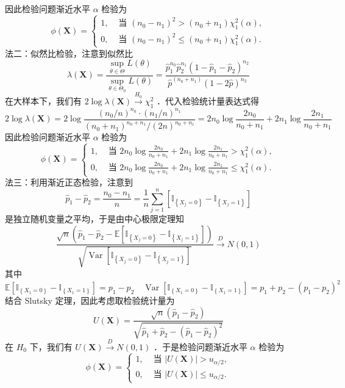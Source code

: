 \documentclass[UTF8]{ctexart}
\begin{document}
因此检验问题渐近水平 $\alpha$ 检验为
$$
\phi(\boldsymbol{X})= \begin{cases}1, & \text { 当 }\left(n_0-n_1\right)^2>\left(n_0+n_1\right) \chi_1^2(\alpha), \\ 0, & \text { 当 }\left(n_0-n_1\right)^2 \leq\left(n_0+n_1\right) \chi_1^2(\alpha) .\end{cases}
$$
法二：似然比检验，注意到似然比
$$
\lambda(\boldsymbol{X})=\frac{\sup _{\theta \in \Theta} L(\theta)}{\sup _{\theta \in \Theta_0} L(\theta)}=\frac{\hat{p}_1^{n_0} \hat{p}_2^{n_1}\left(1-\hat{p}_1-\hat{p}_2\right)^{n_2}}{\hat{p}^{\left(n_0+n_1\right)}(1-2 \hat{p})^{n_2}}
$$
在大样本下，我们有 $2 \log \lambda(\boldsymbol{X}) \xrightarrow{H_0} \chi_1^2$ ．代入检验统计量表达式得
$$
2 \log \lambda(\boldsymbol{X})=2 \log \frac{\left(n_0 / n\right)^{n_0} \cdot\left(n_1 / n\right)^{n_1}}{\left(n_0+n_1\right)^{n_0+n_1} /(2 n)^{n_0+n_1}}=2 n_0 \log \frac{2 n_0}{n_0+n_1}+2 n_1 \log \frac{2 n_1}{n_0+n_1}
$$
因此检验问题渐近水平 $\alpha$ 检验为
$$
\phi(\boldsymbol{X})= \begin{cases}1, & \text { 当 } 2 n_0 \log \frac{2 n_0}{n_0+n_1}+2 n_1 \log \frac{2 n_1}{n_0+n_1}>\chi_1^2(\alpha), \\ 0, & \text { 当 } 2 n_0 \log \frac{2 n_0}{n_0+n_1}+2 n_1 \log \frac{2 n_1}{n_0+n_1} \leq \chi_1^2(\alpha) .\end{cases}
$$
法三：利用渐近正态检验，注意到
$$
\hat{p}_1-\hat{p}_2=\frac{n_0-n_1}{n}=\frac{1}{n} \sum_{j=1}^n\left[\mathbb{I}_{\left\{X_j=0\right\}}-\mathbb{I}_{\left\{X_j=1\right\}}\right]
$$
是独立随机变量之平均，于是由中心极限定理知
$$
\frac{\sqrt{n}\left(\hat{p}_1-\hat{p}_2-\mathbb{E}\left[\mathbb{I}_{\left\{X_j=0\right\}}-\mathbb{I}_{\left\{X_j=1\right\}}\right]\right)}{\sqrt{\operatorname{Var}\left[\mathbb{I}_{\left\{X_j=0\right\}}-\mathbb{I}_{\left\{X_j=1\right\}}\right]}} \xrightarrow{D} N(0,1)
$$
其中 $$\mathbb{E}\left[\mathbb{I}_{\left\{X_1=0\right\}}-\mathbb{I}_{\left\{X_1=1\right\}}\right]=p_1-p_2\quad \operatorname{Var}\left[\mathbb{I}_{\left\{X_1=0\right\}}-\mathbb{I}_{\left\{X_1=1\right\}}\right]=p_1+p_2-\left(p_1-p_2\right)^2$$
结合 Slutsky 定理，因此考虑取检验统计量为
$$
U(\boldsymbol{X})=\frac{\sqrt{n}\left(\hat{p}_1-\hat{p}_2\right)}{\sqrt{\hat{p}_1+\hat{p}_2-\left(\hat{p}_1-\hat{p}_2\right)^2}}
$$
在 $H_0$ 下，我们有 $U(\boldsymbol{X}) \xrightarrow{D} N(0,1)$ ．于是检验问题渐近水平 $\alpha$ 检验为
$$
\phi(\boldsymbol{X})= \begin{cases}1, & \text { 当 }|U(\boldsymbol{X})|>u_{\alpha / 2}, \\ 0, & \text { 当 }|U(\boldsymbol{X})| \leq u_{\alpha / 2} .\end{cases}
$$
\end{document}
